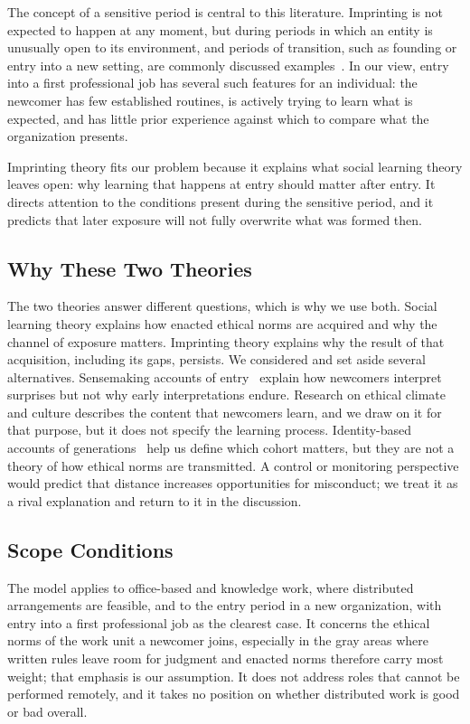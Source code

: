 The concept of a sensitive period is central to this literature. Imprinting is not expected to happen at any moment, but during periods in which an entity is unusually open to its environment, and periods of transition, such as founding or entry into a new setting, are commonly discussed examples~\citep{marquis2013imprinting}. In our view, entry into a first professional job has several such features for an individual: the newcomer has few established routines, is actively trying to learn what is expected, and has little prior experience against which to compare what the organization presents.

Imprinting theory fits our problem because it explains what social learning theory leaves open: why learning that happens at entry should matter after entry. It directs attention to the conditions present during the sensitive period, and it predicts that later exposure will not fully overwrite what was formed then.

\subsection{Why These Two Theories}

The two theories answer different questions, which is why we use both. Social learning theory explains how enacted ethical norms are acquired and why the channel of exposure matters. Imprinting theory explains why the result of that acquisition, including its gaps, persists. We considered and set aside several alternatives. Sensemaking accounts of entry~\citep{louis1980surprise} explain how newcomers interpret surprises but not why early interpretations endure. Research on ethical climate and culture describes the content that newcomers learn, and we draw on it for that purpose, but it does not specify the learning process. Identity-based accounts of generations~\citep{joshi2010unpacking} help us define which cohort matters, but they are not a theory of how ethical norms are transmitted. A control or monitoring perspective would predict that distance increases opportunities for misconduct; we treat it as a rival explanation and return to it in the discussion.

\subsection{Scope Conditions}

The model applies to office-based and knowledge work, where distributed arrangements are feasible, and to the entry period in a new organization, with entry into a first professional job as the clearest case. It concerns the ethical norms of the work unit a newcomer joins, especially in the gray areas where written rules leave room for judgment and enacted norms therefore carry most weight; that emphasis is our assumption. It does not address roles that cannot be performed remotely, and it takes no position on whether distributed work is good or bad overall.
